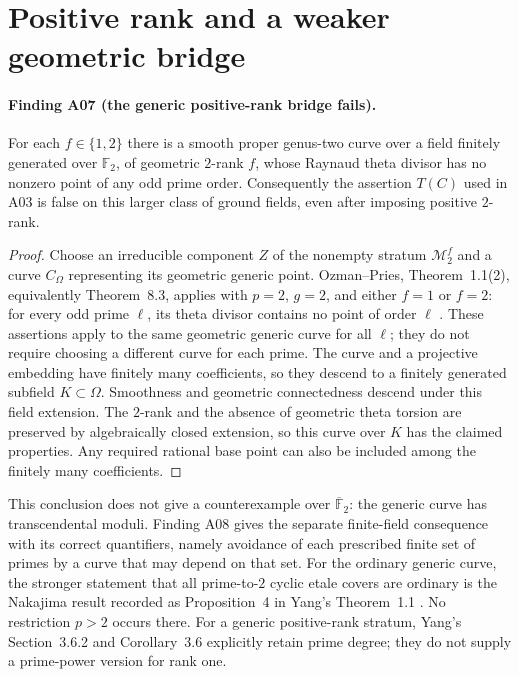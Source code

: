 \documentclass[11pt,a4paper]{article}
\begin{document}

\section{Positive rank and a weaker geometric bridge}
\label{sec:positive-rank-followup}

\paragraph{Finding A07 (the generic positive-rank bridge fails).}
For each $f\in\{1,2\}$ there is a smooth proper genus-two curve over a
field finitely generated over $\mathbb F_2$, of geometric $2$-rank $f$,
whose Raynaud theta divisor has no nonzero point of any odd prime order.
Consequently the assertion $T(C)$ used in A03 is false on this larger
class of ground fields, even after imposing positive $2$-rank.

\begin{proof}
Choose an irreducible component $Z$ of the nonempty stratum
$\mathcal M_2^f$ and a curve $C_\Omega$ representing its geometric
generic point. Ozman--Pries, Theorem~1.1(2), equivalently
Theorem~8.3, applies with $p=2$, $g=2$, and either $f=1$ or $f=2$:
for every odd prime $\ell$, its theta divisor contains no point of
order $\ell$ \cite[pp.~456,473]{OzmanPries2019}.
These assertions apply to the same geometric generic curve for all
$\ell$; they do not require choosing a different curve for each prime.
The curve and a projective embedding have finitely many coefficients,
so they descend to a finitely generated subfield $K\subset\Omega$.
Smoothness and geometric connectedness descend under this field
extension. The $2$-rank and the absence of geometric theta torsion
are preserved by algebraically closed extension, so this curve over
$K$ has the claimed properties. Any required rational base point can
also be included among the finitely many coefficients.
\end{proof}

This conclusion does not give a counterexample over
$\overline{\mathbb F}_2$: the generic curve has transcendental moduli.
Finding A08 gives the separate finite-field consequence with its
correct quantifiers, namely avoidance of each prescribed finite set
of primes by a curve that may depend on that set.
For the ordinary generic curve, the stronger statement that all
prime-to-$2$ cyclic etale covers are ordinary is the Nakajima result
recorded as Proposition~4 in Yang's Theorem~1.1
\cite[Theorem~1.1]{Yang2021}. No restriction $p>2$ occurs there.
For a generic positive-rank stratum, Yang's Section~3.6.2 and
Corollary~3.6 explicitly retain prime degree; they do not supply a
prime-power version for rank one.
\end{document}
